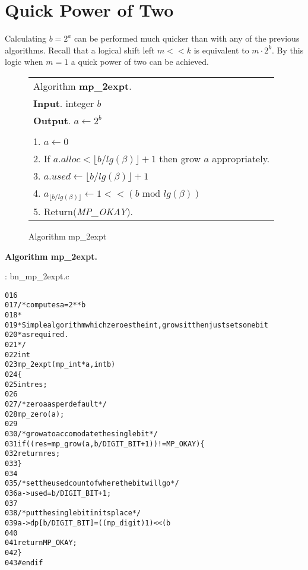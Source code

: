 \documentclass[b5paper]{book}
\begin{document}
\section{Quick Power of Two}
Calculating $b = 2^a$ can be performed much quicker than with any of the previous algorithms.  Recall that a logical shift left $m << k$ is
equivalent to $m \cdot 2^k$.  By this logic when $m = 1$ a quick power of two can be achieved.

\begin{figure}[!here]
\begin{small}
\begin{center}
\begin{tabular}{l}
\hline Algorithm \textbf{mp\_2expt}. \\
\textbf{Input}.   integer $b$ \\
\textbf{Output}.  $a \leftarrow 2^b$ \\
\hline \\
1.  $a \leftarrow 0$ \\
2.  If $a.alloc < \lfloor b / lg(\beta) \rfloor + 1$ then grow $a$ appropriately. \\
3.  $a.used \leftarrow \lfloor b / lg(\beta) \rfloor + 1$ \\
4.  $a_{\lfloor b / lg(\beta) \rfloor} \leftarrow 1 << (b \mbox{ mod } lg(\beta))$ \\
5.  Return(\textit{MP\_OKAY}). \\
\hline
\end{tabular}
\end{center}
\end{small}
\caption{Algorithm mp\_2expt}
\end{figure}

\textbf{Algorithm mp\_2expt.}

\vspace{+3mm}\begin{small}
\hspace{-5.1mm}{\bf File}: bn\_mp\_2expt.c
\vspace{-3mm}
\begin{alltt}
016   
017   /* computes a = 2**b 
018    *
019    * Simple algorithm which zeroes the int, grows it then just sets one bit
020    * as required.
021    */
022   int
023   mp_2expt (mp_int * a, int b)
024   \{
025     int     res;
026   
027     /* zero a as per default */
028     mp_zero (a);
029   
030     /* grow a to accomodate the single bit */
031     if ((res = mp_grow (a, b / DIGIT_BIT + 1)) != MP_OKAY) \{
032       return res;
033     \}
034   
035     /* set the used count of where the bit will go */
036     a->used = b / DIGIT_BIT + 1;
037   
038     /* put the single bit in its place */
039     a->dp[b / DIGIT_BIT] = ((mp_digit)1) << (b % DIGIT_BIT);
040   
041     return MP_OKAY;
042   \}
043   #endif
\end{alltt}
\end{small}
\end{document}
